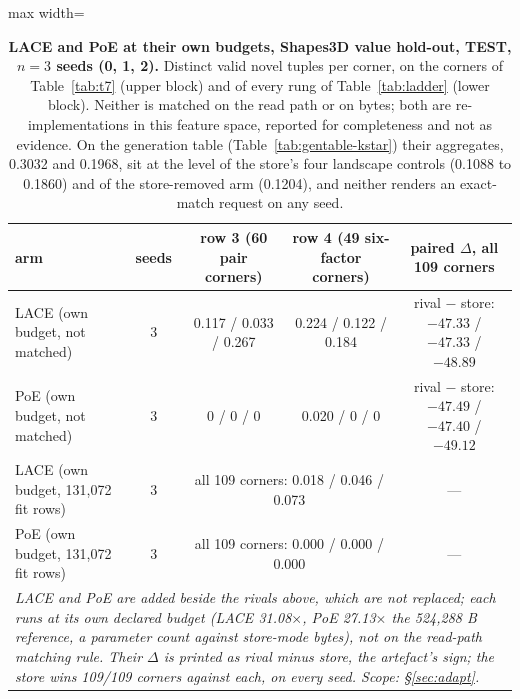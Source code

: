 \documentclass{article} %
\begin{document}
\begin{table}[h]
\centering\scriptsize
\caption{\textbf{LACE and PoE at their own budgets, Shapes3D value hold-out, TEST, $n=3$ seeds (0, 1,
2).} Distinct valid novel tuples per corner, on the corners of Table~\ref{tab:t7} (upper block) and of
every rung of Table~\ref{tab:ladder} (lower block). Neither is matched on the read path or on bytes;
both are re-implementations in this feature space, reported for completeness and not as evidence. On
the generation table (Table~\ref{tab:gentable-kstar}) their aggregates, 0.3032 and 0.1968, sit at the %
level of the store's four landscape controls (0.1088 to 0.1860) and of the store-removed arm %
(0.1204), and neither renders an exact-match request on any seed.} %
\label{tab:lace-poe}
\setlength{\tabcolsep}{2.6pt}
\begin{adjustbox}{max width=\linewidth}\begin{tabular}{lcccc}
\toprule
arm & seeds & row 3 (60 pair corners) & row 4 (49 six-factor corners) & paired $\Delta$, all 109 corners \\ %
\midrule
LACE (own budget, not matched) & 3 & 0.117 / 0.033 / 0.267 & 0.224 / 0.122 / 0.184 & rival $-$ store: $-47.33$ / $-47.33$ / $-48.89$ \\
PoE (own budget, not matched) & 3 & 0 / 0 / 0 & 0.020 / 0 / 0 & rival $-$ store: $-47.49$ / $-47.40$ / $-49.12$ \\
LACE (own budget, 131,072 fit rows) & 3 & \multicolumn{2}{c}{all 109 corners: 0.018 / 0.046 / 0.073} & --- \\
PoE (own budget, 131,072 fit rows) & 3 & \multicolumn{2}{c}{all 109 corners: 0.000 / 0.000 / 0.000} & --- \\
\multicolumn{5}{p{15cm}}{\emph{LACE and PoE are added beside the rivals above, which are not replaced; each runs at its own declared budget (LACE 31.08$\times$, PoE 27.13$\times$ the 524,288 B reference, a parameter count against store-mode bytes), not on the read-path matching rule. Their $\Delta$ is printed as rival minus store, the artefact's sign; the store wins 109/109 corners against each, on every seed. Scope: \S\ref{sec:adapt}.}} \\
\bottomrule
\end{tabular}\end{adjustbox}


\end{table}
\end{document}

